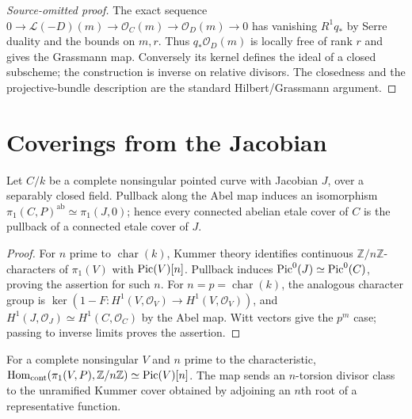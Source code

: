 \begin{proof}[Source-omitted proof]

The exact sequence $0\to\mathcal L(-D)(m)\to\mathcal O_C(m)\to
\mathcal O_D(m)\to0$ has vanishing $R^1q_*$ by Serre duality and the bounds
on $m,r$.  Thus $q_*\mathcal O_D(m)$ is locally free of rank $r$ and gives the
Grassmann map.  Conversely its kernel defines the ideal of a closed subscheme;
the construction is inverse on relative divisors.  The closedness and the
projective-bundle description are the standard Hilbert/Grassmann argument.

\end{proof}


\section{Coverings from the Jacobian}
\begin{proposition}
\label{prop:milne-abelian-coverings-source}

Let $C/k$ be a complete nonsingular pointed curve with Jacobian $J$, over a
separably closed field.  Pullback along the Abel map induces an isomorphism
$\pi_1(C,P)^{\mathrm{ab}}\simeq\pi_1(J,0)$; hence every connected abelian
etale cover of $C$ is the pullback of a connected etale cover of $J$.
\end{proposition}

\begin{proof}

For $n$ prime to $\operatorname{char}(k)$, Kummer theory identifies continuous
$\mathbb Z/n\mathbb Z$-characters of $\pi_1(V)$ with $\operatorname{Pic}(V)[n]$.  Pullback
induces $\operatorname{Pic}^0(J)\simeq\operatorname{Pic}^0(C)$, proving the assertion for such $n$.
For $n=p=\operatorname{char}(k)$, the analogous character group is
$\ker(1-F:H^1(V,\mathcal O_V)\to H^1(V,\mathcal O_V))$, and
$H^1(J,\mathcal O_J)\simeq H^1(C,\mathcal O_C)$ by the Abel map.  Witt vectors
give the $p^m$ case; passing to inverse limits proves the assertion.

\end{proof}


\begin{lemma}
\label{lem:milne-kummer-characters-source}

For a complete nonsingular $V$ and $n$ prime to the characteristic,
$\operatorname{Hom}_{\mathrm{cont}}(\pi_1(V,P),\mathbb Z/n\mathbb Z)
\simeq\operatorname{Pic}(V)[n]$.  The map sends an $n$-torsion divisor class to the unramified Kummer
cover obtained by adjoining an $n$th root of a representative function.
\end{lemma}

